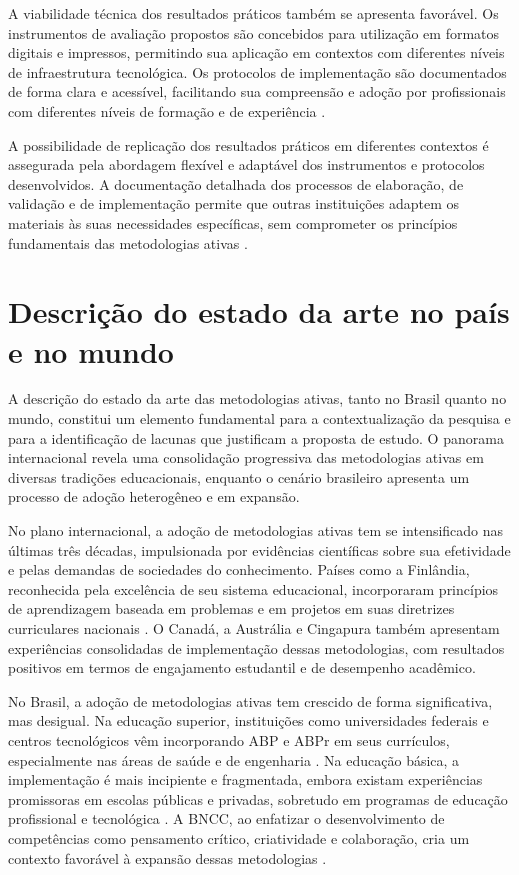 A viabilidade técnica dos resultados práticos também se apresenta favorável. Os instrumentos de avaliação propostos são concebidos para utilização em formatos digitais e impressos, permitindo sua aplicação em contextos com diferentes níveis de infraestrutura tecnológica. Os protocolos de implementação são documentados de forma clara e acessível, facilitando sua compreensão e adoção por profissionais com diferentes níveis de formação e de experiência \cite{RIOS2026}.

A possibilidade de replicação dos resultados práticos em diferentes contextos é assegurada pela abordagem flexível e adaptável dos instrumentos e protocolos desenvolvidos. A documentação detalhada dos processos de elaboração, de validação e de implementação permite que outras instituições adaptem os materiais às suas necessidades específicas, sem comprometer os princípios fundamentais das metodologias ativas \cite{FREITAS2024}.

\section{Descrição do estado da arte no país e no mundo}
\label{sec:estado_arte}

A descrição do estado da arte das metodologias ativas, tanto no Brasil quanto no mundo, constitui um elemento fundamental para a contextualização da pesquisa e para a identificação de lacunas que justificam a proposta de estudo. O panorama internacional revela uma consolidação progressiva das metodologias ativas em diversas tradições educacionais, enquanto o cenário brasileiro apresenta um processo de adoção heterogêneo e em expansão.

No plano internacional, a adoção de metodologias ativas tem se intensificado nas últimas três décadas, impulsionada por evidências científicas sobre sua efetividade e pelas demandas de sociedades do conhecimento. Países como a Finlândia, reconhecida pela excelência de seu sistema educacional, incorporaram princípios de aprendizagem baseada em problemas e em projetos em suas diretrizes curriculares nacionais \cite{BONWELL1991}. O Canadá, a Austrália e Cingapura também apresentam experiências consolidadas de implementação dessas metodologias, com resultados positivos em termos de engajamento estudantil e de desempenho acadêmico.

No Brasil, a adoção de metodologias ativas tem crescido de forma significativa, mas desigual. Na educação superior, instituições como universidades federais e centros tecnológicos vêm incorporando ABP e ABPr em seus currículos, especialmente nas áreas de saúde e de engenharia \cite{GOMES2009}. Na educação básica, a implementação é mais incipiente e fragmentada, embora existam experiências promissoras em escolas públicas e privadas, sobretudo em programas de educação profissional e tecnológica \cite{TEODORO2024}. A BNCC, ao enfatizar o desenvolvimento de competências como pensamento crítico, criatividade e colaboração, cria um contexto favorável à expansão dessas metodologias \cite{BRASIL2018}.

